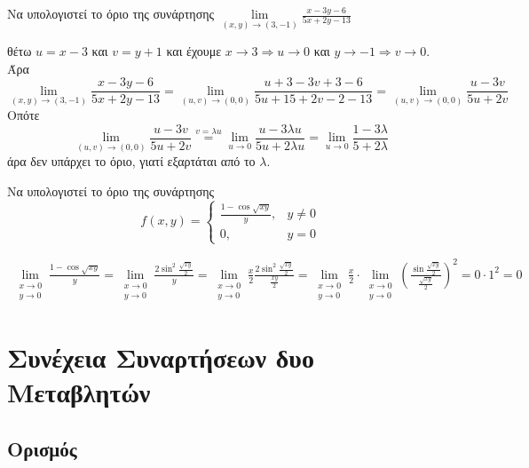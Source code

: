 \begin{example}
  Να υπολογιστεί το όριο της συνάρτησης 
  $ \lim\limits_{(x,y)\to (3, -1)} \frac{x-3y-6}{5x+2y-13} $ 
  \begin{solution}
    θέτω $ u=x-3 $ και $ v=y+1 $ και έχουμε $ x \to 3 \Rightarrow u \to 0 $ και 
    $ y \to -1 \Rightarrow v \to 0 $. Άρα
    \[
      \lim\limits_{(x,y)\to (3, -1)} \frac{x-3y-6}{5x+2y-13} = \lim_{(u,v) \to (0,0)} 
      \frac{u+3-3v+3-6}{5u+15+2v-2-13} = \lim_{(u,v) \to (0,0)} \frac{u-3v}{5u+2v}
    \] 
    Οπότε
    \[
      \lim_{(u,v) \to (0,0)} \frac{u-3v}{5u+2v} \overset{v= \lambda u}{=} 
      \lim_{u \to 0} \frac{u- 3 \lambda u}{5u + 2 \lambda u} = \lim_{u \to 0}
      \frac{1 - 3 \lambda}{5 + 2 \lambda}
    \]
    άρα δεν υπάρχει το όριο, γιατί εξαρτάται από το $ \lambda $.
  \end{solution}
\end{example}

\begin{example}
  Να υπολογιστεί το όριο της συνάρτησης
  \[
    f(x,y) = 
    \begin{cases} 
      \frac{1 - \cos{\sqrt{xy}}}{y}, & y \neq 0 \\ 0, & y =0 
    \end{cases}  
  \] 
  \begin{solution}
    \begin{align*}
      \lim\limits_{\substack{x\to 0 \\y \to 0}} \frac{1- \cos{\sqrt{xy}}}{y} =
      \lim\limits_{\substack{x\to 0 \\y \to 0}} \frac{2
      \sin^{2}{\frac{\sqrt{xy}}{2}}}{y} = 
      \lim\limits_{\substack{x\to 0 \\y \to 0}} \frac{x}{2} \frac{2
      \sin^{2}{\frac{\sqrt{xy}}{2}}}{\frac{xy}{2}} =
      \lim\limits_{\substack{x\to 0 \\y \to 0}} \frac{x}{2} 
      \cdot\lim\limits_{\substack{x\to 0 \\y \to 0}}
      \left(\frac{\sin{\frac{\sqrt{xy}}{2}}}{\frac{\sqrt{xy}}{2}} \right)^{2} 
      = 0 \cdot 1^{2} = 0 
    \end{align*} 
  \end{solution}
\end{example}


\chapter{Συνέχεια Συναρτήσεων δυο Μεταβλητών}

\section{Ορισμός}


